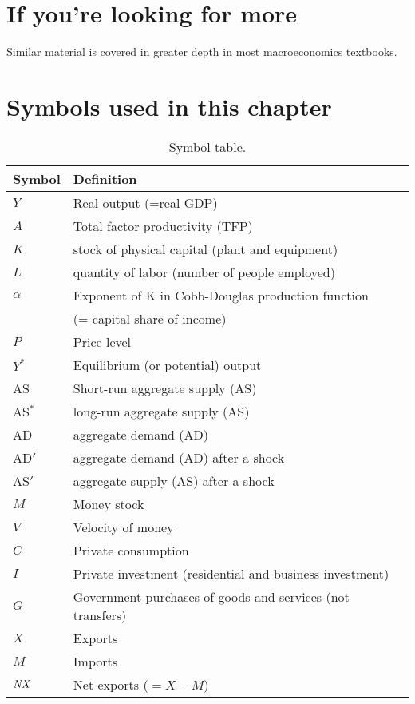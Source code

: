 \section*{If you're looking for more}

Similar material is covered in greater depth
in most macroeconomics textbooks.

\section*{Symbols used in this chapter}

\begin{table}[H]
\centering
\caption{Symbol table.}
\begin{tabular*}{0.95\textwidth}{l@{\extracolsep{\fill}}l}
\toprule
Symbol & Definition\\
\midrule
$Y$    &Real output (=real GDP)\\
$A$    &Total factor productivity (TFP)\\
$K$    &stock of physical capital  (plant and equipment)\\
$L$    &quantity of labor (number of people employed)\\
$\alpha$     &Exponent of K in Cobb-Douglas production function \\
        &(= capital share of income)\\
$P$    &Price level\\
$Y^*$    &Equilibrium (or potential) output\\
AS    &Short-run aggregate supply (AS)
\\
AS$^*$    &  long-run aggregate supply
 (AS)


\\
AD    &aggregate demand (AD)
\\
AD$'$    &aggregate demand (AD)
 after a shock\\
AS$'$    &aggregate supply (AS)
 after a shock\\
$M$    &Money stock\\
$V$    &Velocity of money\\
$C$    &Private consumption\\
$I$    &Private investment (residential and business investment)\\
$G$    &Government purchases of goods and services (not transfers)\\
$X$    &Exports\\
$M$    &Imports\\
$\mbox{\em NX\/}$    &Net exports ($=X-M$)\\
\bottomrule
\end{tabular*}
\end{table}
